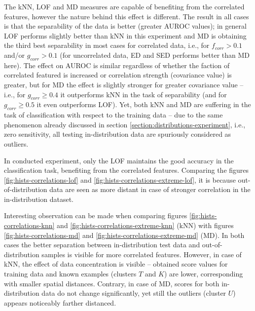 The kNN, LOF and MD measures are capable of benefiting from the correlated features, however the nature behind this effect is different. The result in all cases is that the separability of the data is better (greater AUROC values); in general LOF performs slightly better than kNN in this experiment and MD is obtaining the third best separability in most cases for correlated data, i.e., for $f_{corr} > 0.1$ and/or $g_{corr} > 0.1$ (for uncorrelated data, ED and SED performs better than MD here). The effect on AUROC is similar regardless of whether the faction of correlated featured is increased or correlation strength (covariance value) is greater, but for MD the effect is slightly stronger for greater covariance value – i.e., for $g_{corr} \geq 0.4$ it outperforms kNN in the task of separability (and for $g_{corr} \geq 0.5$ it even outperforms LOF). Yet, both kNN and MD are suffering in the task of classification with respect to the training data – due to the same phenomenon already discussed in section \ref{section:distributions-experiment}, i.e., zero sensitivity, all testing in-distribution data are spuriously considered as outliers.

In conducted experiment, only the LOF maintains the good accuracy in the classification task, benefiting from the correlated features. Comparing the figures \ref{fig:hists-correlations-lof} and \ref{fig:hists-correlations-extreme-lof}, it is because out-of-distribution data are seen as more distant in case of stronger correlation in the in-distribution dataset.

Interesting observation can be made when comparing figures \ref{fig:hists-correlations-knn} and \ref{fig:hists-correlations-extreme-knn} (kNN) with figures \ref{fig:hists-correlations-md} and \ref{fig:hists-correlations-extreme-md} (MD). In both cases the better separation between in-distribution test data and out-of-distribution samples is visible for more correlated features. However, in case of kNN, the effect of data concentration is visible – obtained score values for training data and known examples (clusters $T$ and $K$) are lower, corresponding with smaller spatial distances. Contrary, in case of MD, scores for both in-distribution data do not change significantly, yet still the outliers (cluster $U$) appears noticeably farther distanced.

